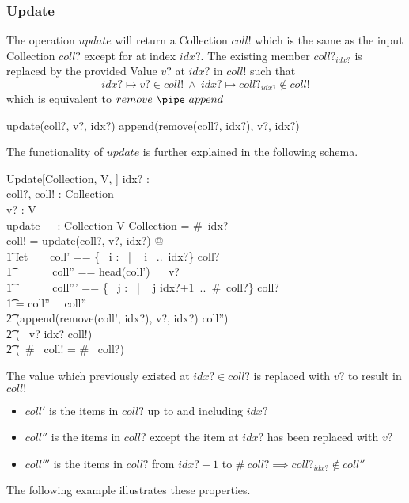 \documentclass[../../main.tex]{subfiles}
\begin{document}
\subsubsection{Update}
The operation $update$ will return a Collection $coll!$ which is the same as the input Collection $coll?$
except for at index $idx?$. The existing member $coll?_{idx?}$ is replaced by the provided Value $v?$ at $idx?$ in $coll!$
such that
$$idx? \mapsto v? \in coll! ~ \land ~ idx? \mapsto coll?_{idx?} \not \in coll!$$
which is equivalent to $remove ~\pipe ~append$
\begin{zed}
  update(coll?, v?, idx?) \equiv append(remove(coll?, idx?), v?, idx?)
\end{zed}
The functionality of $update$ is further explained in the following schema.
\begin{schema}{Update[Collection, V, \nat]}
  idx? : \nat \\
  coll?, coll! : Collection \\
  v? : V \\
  update~\_ : Collection \cross V \cross \nat \bij Collection
   = \#~idx? \\
  coll! = update(coll?, v?, idx?) @ \\
  \t1 let ~ ~ coll' == \{~ i : \nat ~| ~ i ~..~idx?\} \extract coll? \\
  \t1 \ \ \ ~~~ coll'' == head(coll') ~\cat ~ v?\\
  \t1 \ \ \ ~~~ coll''' == \{~ j : \nat ~| ~ j \in idx?+1~..~\#~coll?\} \extract coll? \\
  \t1 =  coll'' ~\cat ~coll'' \implies \\
  \t2 (append(remove(coll', idx?), v?, idx?) \cat  coll'') ~ \land \\
  \t2 (~ v? \mapsto idx? \in coll!) ~\land \\
  \t2 (~\#~ coll! = \#~ coll?) ~\land
\end{schema}
The value which previously existed at $idx? \in coll?$ is replaced with $v?$ to result in $coll!$
\begin{itemize}
\item $coll'$ is the items in $coll?$ up to and including $idx?$
\item $coll''$ is the items in $coll?$ except the item at $idx?$ has been replaced with $v?$
\item $coll'''$ is the items in $coll?$ from $idx?+1$ to $\#~coll? \implies coll?_{idx?} \not \in coll''$
\end{itemize}
The following example illustrates these properties.
\end{document}
